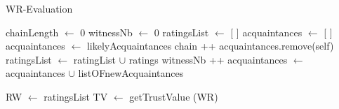 
\begin{algorithm}[H]
\caption{WR-Evaluation}
\begin{algorithmic} 
\STATE chainLength $\leftarrow$ 0
\STATE witnessNb $\leftarrow$ 0
\STATE ratingsList $\leftarrow$ [ ]
\STATE acquaintances $\leftarrow$ [ ]
\STATE acquaintances $\leftarrow$ likelyAcquaintances
\ENDWHILE
{}
\STATE chain ++
\STATE acquaintances.remove(self)
\STATE ratingsList $\leftarrow$ ratingList $\cup$ ratings
\STATE witnessNb ++
\ELSE
\STATE acquaintances $\leftarrow$ acquaintances $\cup$ listOFnewAcquaintances
\ENDIF
\ENDFOR
\ENDWHILE

\STATE RW $\leftarrow$ ratingsList
\STATE TV $\leftarrow$ getTrustValue (WR)
	
\end{algorithmic}
\end{algorithm}



